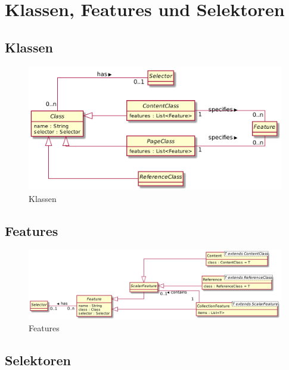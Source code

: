 \section{Klassen, Features und Selektoren}
    \subsection{Klassen}
        \begin{figure}[htb]
            \centering
            \includegraphics[width=\textwidth]{../resources/concept/classes.png}
            \caption{Klassen}
            \label{image:conceptClasses}
        \end{figure}

    \subsection{Features}
        \begin{figure}[htb]
            \centering
            \includegraphics[width=\textwidth]{../resources/concept/features.png}
            \caption{Features}
            \label{image:conceptFeatures}
        \end{figure}
    
    \subsection{Selektoren}